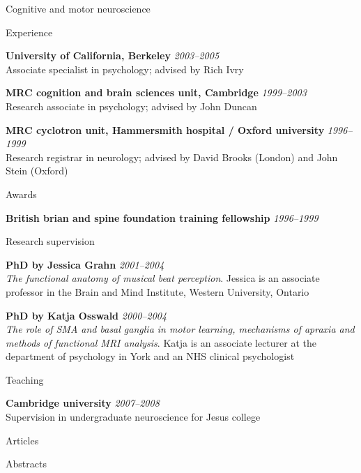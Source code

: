 \documentclass{cv}
\newcommand{\PlaceDateNote}[3]{{\bf #1} \hfill {\em #2} \\#3}
\newcommand{\UCB}{University of California, Berkeley}
\newcommand{\CBU}{MRC cognition and brain sciences unit, Cambridge}
\begin{document}
\begin{cvSection}{Cognitive and motor neuroscience}

\begin{cvSubSection}{Experience}

\PlaceDateNote{\UCB}{2003--2005 }{
Associate specialist in psychology; advised by Rich Ivry}

\PlaceDateNote{\CBU}{1999--2003 }{
Research associate in psychology; advised by John Duncan}

{\bf MRC cyclotron unit, Hammersmith hospital / Oxford university}
\hfill {\em 1996--1999} \\
Research registrar in neurology; advised by David Brooks (London) and John
Stein (Oxford)

\end{cvSubSection}

\begin{cvSubSection}{Awards}

{\bf British brian and spine foundation training fellowship} \hfill {\em
1996--1999}

\end{cvSubSection}

\begin{cvSubSection}{Research supervision}

\PlaceDateNote{PhD by Jessica Grahn}{2001--2004}{
{\em The functional anatomy of musical beat perception}. Jessica is an
associate professor in the Brain and Mind Institute, Western University,
Ontario}

\PlaceDateNote{PhD by Katja Osswald}{2000--2004}{
{\em The role of SMA and basal ganglia in motor learning, mechanisms of
apraxia and methods of functional MRI analysis}. Katja is an associate
lecturer at the department of psychology in York and an NHS clinical
psychologist}

\end{cvSubSection}

\begin{cvSubSection}{Teaching}

\PlaceDateNote{Cambridge university}{2007--2008}{
Supervision in undergraduate neuroscience for Jesus college}

\end{cvSubSection}

\begin{cvSubSection}{Articles}

\printbibliography[heading=none,
    keyword=movethink,
    keyword=article,
notkeyword=omit]

\end{cvSubSection}

\begin{cvSubSection}{Abstracts}

\printbibliography[heading=none,
    keyword=movethink,
    keyword=abstract,
notkeyword=omit]

\end{cvSubSection}

\end{cvSection}
\end{document}

